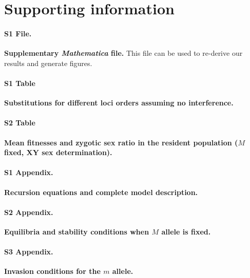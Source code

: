 \documentclass[10pt,letterpaper]{article}
\begin{document}





\section*{Supporting information}

\paragraph*{S1 File.}
\label{file:Mathematica}
{\bf Supplementary \textit{Mathematica} file.}  This file can be used to re-derive our results and generate figures. 

\paragraph*{S1 Table}
\label{tab:chisubstitutions}
{\bf Substitutions for different loci orders assuming no interference.}

\paragraph*{S2 Table}
\label{tab:meanfitnesses}
{\bf Mean fitnesses and zygotic sex ratio in the resident population ($M$ fixed, XY sex determination). }

\paragraph*{S1 Appendix.}
\label{app:recurs}
{\bf Recursion equations and complete model description.} 

\paragraph*{S2 Appendix.}
\label{app:eq_stab}
{\bf Equilibria and stability conditions when $M$ allele is fixed. } 

\paragraph*{S3 Appendix.}
\label{app:inv_cond}
{\bf Invasion conditions for the $m$ allele.} 
\end{document}
